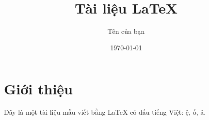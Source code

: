 \documentclass{article}
\title{Tài liệu LaTeX}
\author{Tên của bạn}
\date{\today}
\begin{document}
\maketitle

\section{Giới thiệu}
Đây là một tài liệu mẫu viết bằng LaTeX có dấu tiếng Việt: ệ, ố, ả.
\end{document}
